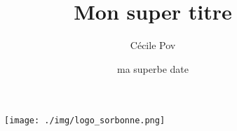 \documentclass[11pt]{report}
\title{Mon super titre}
\date{ma superbe date}
\author{Cécile Pov}
\begin{document}
\thispagestyle{empty}

\begin{figure}[t]

  
\endminipage\hfill
{}
  \texttt{[image: ./img/logo\_sorbonne.png]}
\endminipage\hfill
{}
\hspace*{2.2cm}
\vspace*{0.3cm}
  
\endminipage
\end{figure}
\end{document}
